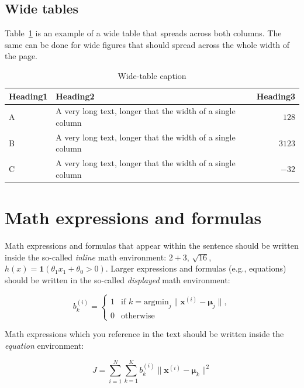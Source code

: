 \documentclass[10pt, a4paper]{article}
\begin{document}
\subsection{Wide tables}

Table~\ref{tab:wide-table} is an example of a wide table that spreads across both columns. The same can be done for wide figures that should spread across the whole width of the page. 

\begin{table}
\caption{Wide-table caption}
\label{tab:wide-table}
\begin{center}
\begin{tabular}{llr}
\toprule
Heading1 & Heading2 & Heading3\\
\midrule
A & A very long text, longer that the width of a single column & $128$\\
B & A very long text, longer that the width of a single column & $3123$\\
C & A very long text, longer that the width of a single column & $-32$\\
\bottomrule
\end{tabular}
\end{center}
\end{table}

\section{Math expressions and formulas}

Math expressions and formulas that appear within the sentence should be written inside the so-called \emph{inline} math environment: $2+3$, $\sqrt{16}$, $h(x)=\mathbf{1}(\theta_1 x_1 + \theta_0>0)$. Larger expressions and formulas (e.g., equations) should be written in the so-called \emph{displayed} math environment:

\[
b^{(i)}_k = \begin{cases}
1 & \text{if 
    $k = \text{argmin}_j \| \mathbf{x}^{(i)} - \mathbf{\mu}_j \|,$}\\
0 & \text{otherwise}
\end{cases}
\]

Math expressions which you reference in the text should be written inside the \textit{equation} environment:

\begin{equation}\label{eq:kmeans-error}
J = \sum_{i=1}^N \sum_{k=1}^K 
b^{(i)}_k \| \mathbf{x}^{(i)} - \mathbf{\mu}_k \|^2
\end{equation}
\end{document}
